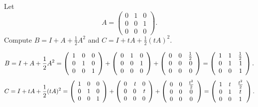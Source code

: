 \documentclass{ximera}
\begin{document}
\begin{exercise} \label{c4.7.4}
Let
\[
A = \left(\begin{array}{ccc} 0 & 1 & 0\\ 0 & 0 & 1 \\ 0 & 0 & 0 \end{array}
\right).
\]
Compute $B=I+A+\frac{1}{2}A^2$ and $C=I+tA+\frac{1}{2}(tA)^2$.

\begin{solution}

\[ 
B = I + A + \frac{1}{2}A^2 =
 \left(\begin{array}{rrr} 1 & 0 & 0 \\ 0 & 1 & 0 \\ 0 & 0 & 1\end{array}\right) +
\left(\begin{array}{rrr} 0 & 1 & 0 \\ 0 & 0 & 1 \\ 0 & 0 & 0\end{array}\right) +
\left(\begin{array}{rrr} 0 & 0 & \frac{1}{2} \\ 0 & 0 & 0 \\ 0 & 0 & 0\end{array}\right)
= \left(\begin{array}{rrr} 1 & 1 & \frac{1}{2} \\ 0 & 1 & 1 \\ 0 & 0 & 1\end{array}\right). \]
\[ 
C = I + tA + \frac{1}{2}(tA)^2 
= \left(\begin{array}{rrr} 1 & 0 & 0 \\ 0 & 1 & 0 \\ 0 & 0 & 1\end{array}\right) +
\left(\begin{array}{rrr} 0 & t & 0 \\ 0 & 0 & t \\ 0 & 0 & 0\end{array}\right) +
\left(\begin{array}{ccc} 0 & 0 & \frac{t^2}{2} \\ 0 & 0 & 0 \\ 0 & 0 & 0\end{array}\right)
= \left(\begin{array}{ccc} 1 & t & \frac{t^2}{2} \\ 0 & 1 & t \\ 0 & 0 & 1\end{array}\right). \]

\end{solution}
\end{exercise}
\end{document}
